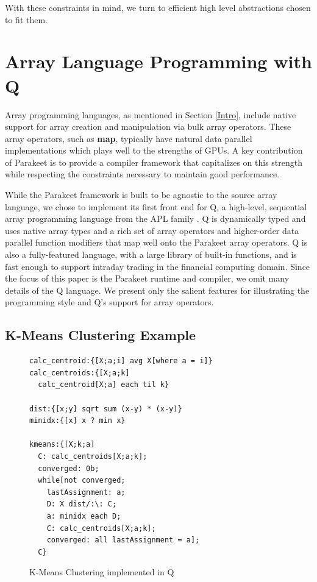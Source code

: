 \documentclass[preprint]{sigplanconf}
\begin{document}
With these constraints in mind, we turn to efficient high level abstractions chosen to fit them.

\section{Array Language Programming with Q}
\label{Q}
Array programming languages, as mentioned in Section \ref{Intro}, include native support for array creation and manipulation via bulk array operators. These array operators, such as \textbf{map}, typically have natural data parallel implementations which plays well to the strengths of GPUs.  A key contribution of Parakeet is to provide a compiler framework that capitalizes on this strength while respecting the constraints necessary to maintain good performance.

While the Parakeet framework is built to be agnostic to the source array language, we chose to implement its first front end for Q, a high-level, sequential array programming language from the APL family \cite{Borr08}. Q is dynamically typed and uses native array types and a rich set of array operators and higher-order data parallel function modifiers that map well onto the Parakeet array operators. Q is also a fully-featured language, with a large library of built-in functions, and is fast enough to support
intraday trading in the financial computing domain. Since the focus of this paper is the Parakeet runtime and compiler, we omit many details of the Q language.  We present only the salient features for illustrating the programming style and Q's support for array operators.

\subsection{K-Means Clustering Example}
\begin{figure}[h!]
\begin{lstlisting}
calc_centroid:{[X;a;i] avg X[where a = i]}
calc_centroids:{[X;a;k]
  calc_centroid[X;a] each til k}

dist:{[x;y] sqrt sum (x-y) * (x-y)}
minidx:{[x] x ? min x}

kmeans:{[X;k;a]
  C: calc_centroids[X;a;k];
  converged: 0b;
  while[not converged;
    lastAssignment: a;
    D: X dist/:\: C;
    a: minidx each D;
    C: calc_centroids[X;a;k];
    converged: all lastAssignment = a];
  C}
\end{lstlisting}
\caption{K-Means Clustering implemented in Q}
\label{QKMeans}
\end{figure}
\end{document}
